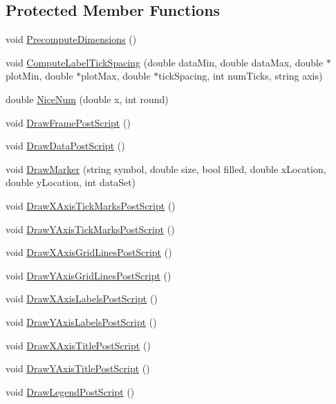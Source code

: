 \subsection*{Protected Member Functions}
\begin{DoxyCompactItemize}
\item 
void \hyperlink{class_c_plot2_d_a28b46f78d3100ba8df655558153b66c5}{Precompute\-Dimensions} ()
\item 
void \hyperlink{class_c_plot2_d_a2a65c7b90fcd75d4dbdb198855f65cfd}{Compute\-Label\-Tick\-Spacing} (double data\-Min, double data\-Max, double $\ast$plot\-Min, double $\ast$plot\-Max, double $\ast$tick\-Spacing, int num\-Ticks, string axis)
\item 
double \hyperlink{class_c_plot2_d_a71df27f83d8bf442444e5505015278bc}{Nice\-Num} (double x, int round)
\item 
void \hyperlink{class_c_plot2_d_a6fccef7606ab4a6ea17cce26ac2980d2}{Draw\-Frame\-Post\-Script} ()
\item 
void \hyperlink{class_c_plot2_d_a62ac45221012404cd528fd3e18b83288}{Draw\-Data\-Post\-Script} ()
\item 
void \hyperlink{class_c_plot2_d_a7521eb1865e2ad3e5afcd9be4698b1a5}{Draw\-Marker} (string symbol, double size, bool filled, double x\-Location, double y\-Location, int data\-Set)
\item 
void \hyperlink{class_c_plot2_d_a1e0b5d4eff0ea385a9a2246cd387a541}{Draw\-X\-Axis\-Tick\-Marks\-Post\-Script} ()
\item 
void \hyperlink{class_c_plot2_d_a9755999ba6d72a86202aaaeb81e51eea}{Draw\-Y\-Axis\-Tick\-Marks\-Post\-Script} ()
\item 
void \hyperlink{class_c_plot2_d_afa2a4c1c3f4c60a837429eab4a998c0f}{Draw\-X\-Axis\-Grid\-Lines\-Post\-Script} ()
\item 
void \hyperlink{class_c_plot2_d_af0cc0ba9d46cd4b264cabe61179b3a38}{Draw\-Y\-Axis\-Grid\-Lines\-Post\-Script} ()
\item 
void \hyperlink{class_c_plot2_d_adc1ecc98dab695922e6b4647b9e626da}{Draw\-X\-Axis\-Labels\-Post\-Script} ()
\item 
void \hyperlink{class_c_plot2_d_ab9be0d75ba5736ae9a97e09104cfebac}{Draw\-Y\-Axis\-Labels\-Post\-Script} ()
\item 
void \hyperlink{class_c_plot2_d_afc0e4f9d8ef79c695ceafd5542ff2773}{Draw\-X\-Axis\-Title\-Post\-Script} ()
\item 
void \hyperlink{class_c_plot2_d_aa7985ce6904c62a24dd3c2aeb6dd01d1}{Draw\-Y\-Axis\-Title\-Post\-Script} ()
\item 
void \hyperlink{class_c_plot2_d_a3b418cf2f782cfbc1f2d68d468990167}{Draw\-Legend\-Post\-Script} ()
\end{DoxyCompactItemize}
